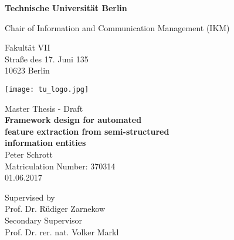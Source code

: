 \thispagestyle{empty}
\begin{center}

\vspace*{1.2cm}
{\LARGE \textbf{Technische Universität Berlin}}

\vspace{0.5cm}

{\large Chair of Information and Communication Management (IKM)\\[5mm]}

Fakultät VII\\
Straße des 17. Juni 135\\
10623 Berlin\\

\vspace*{1cm}

\texttt{[image: tu\_logo.jpg]}

\vspace*{1.0cm}

{\large Master Thesis - Draft}\\

\vspace{1.0cm}
{\LARGE \textbf{Framework design for automated}}\\
\vspace*{0.25cm}
{\LARGE \textbf{feature extraction from semi-structured}}\\
\vspace*{0.35cm}
{\LARGE \textbf{ information entities}}\\
\vspace*{1.0cm}
{\LARGE Peter Schrott}
\\
\vspace*{0.5cm}
Matriculation Number: 370314\\
01.06.2017\\ %
\vspace*{1.0cm}

Supervised by\\
Prof. Dr. Rüdiger Zarnekow\\
\vspace*{0.5cm}
Secondary Supervisor\\
Prof. Dr. rer. nat. Volker Markl
\vspace{3cm}

\end{center}